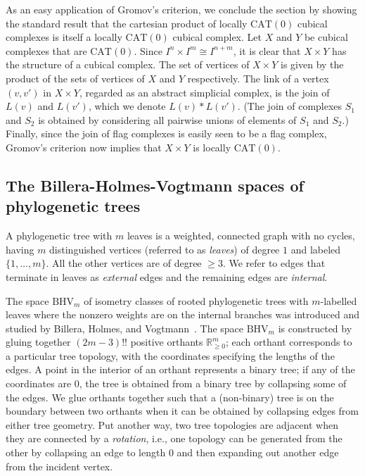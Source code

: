 \documentclass[a4paper,11pt]{article}
\newcommand{\CAT}{\textrm{CAT}}
\newcommand{\BHV}{\textrm{BHV}}
\begin{document}
As an easy application of Gromov's criterion, we conclude the section
by showing the standard result that the cartesian product of locally $\CAT(0)$ cubical complexes is itself a locally $\CAT(0)$ cubical complex.
Let $X$ and $Y$ be cubical complexes that are $\CAT(0)$.
Since $I^n \times I^m \cong I^{n+m}$, it is clear that $X \times Y$ has the structure of a cubical complex.
The set of vertices of $X \times Y$ is given by the product of the sets of vertices of $X$ and $Y$ respectively.
The link of a vertex $(v,v')$ in $X \times Y$, regarded as an abstract simplicial complex, is the join of $L(v)$ and $L(v')$, which we denote $L(v) \ast L(v')$.
(The join of complexes $S_1$ and $S_2$ is obtained by considering all pairwise unions of elements of $S_1$ and $S_2$.)
Finally, since the join of flag complexes is easily seen to be a flag complex, Gromov's criterion now implies that $X \times Y$ is locally $\CAT(0)$.

\subsection{The Billera-Holmes-Vogtmann spaces of phylogenetic trees}

A phylogenetic tree with $m$ leaves is a weighted, connected graph
with no cycles, having $m$ distinguished vertices (referred to as {\em
  leaves}) of degree $1$ and labeled $\{1, \ldots, m\}$.  All the
other vertices are of degree $\geq 3$.  We refer to edges that
terminate in leaves as {\em external} edges and the remaining edges
are {\em internal}.

The space $\BHV_m$ of isometry classes of rooted phylogenetic trees
with $m$-labelled leaves where the nonzero weights are on the internal
branches was introduced and studied by Billera, Holmes, and
Vogtmann~\cite{billera2001geometry}.  The space $\BHV_m$ is
constructed by gluing together $(2m-3)!!$ positive orthants
$\mathbb{R}^m_{\geq 0}$; each orthant corresponds to a particular tree
topology, with the coordinates specifying the lengths of the edges.  A
point in the interior of an orthant represents a binary tree; if any
of the coordinates are $0$, the tree is obtained from a binary tree by
collapsing some of the edges.  We glue orthants together such that a
(non-binary) tree is on the boundary between two orthants when it can
be obtained by collapsing edges from either tree geometry.  Put
another way, two tree topologies are adjacent when they are connected
by a {\em rotation}, i.e., one topology can be generated from the
other by collapsing an edge to length $0$ and then expanding out
another edge from the incident vertex.
\end{document}
